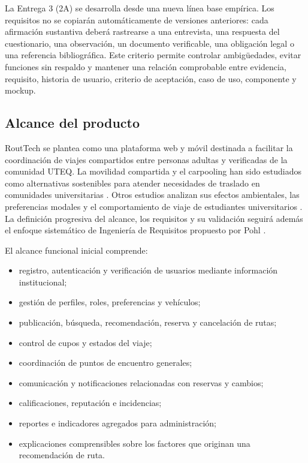 \documentclass[12pt,a4paper]{article}
\begin{document}
La Entrega 3 (2A) se desarrolla desde una nueva línea base empírica. Los requisitos no se copiarán automáticamente de versiones anteriores: cada afirmación sustantiva deberá rastrearse a una entrevista, una respuesta del cuestionario, una observación, un documento verificable, una obligación legal o una referencia bibliográfica. Este criterio permite controlar ambigüedades, evitar funciones sin respaldo y mantener una relación comprobable entre evidencia, requisito, historia de usuario, criterio de aceptación, caso de uso, componente y mockup.

\subsection{Alcance del producto}

RoutTech se plantea como una plataforma web y móvil destinada a facilitar la coordinación de viajes compartidos entre personas adultas y verificadas de la comunidad UTEQ. La movilidad compartida y el carpooling han sido estudiados como alternativas sostenibles para atender necesidades de traslado en comunidades universitarias \cite{alquhtani2022,lopezchila2025}. Otros estudios analizan sus efectos ambientales, las preferencias modales y el comportamiento de viaje de estudiantes universitarios \cite{arbelaez2023,bagdatli2022,etminani2023,tomas2021,zhu2022}. La definición progresiva del alcance, los requisitos y su validación seguirá además el enfoque sistemático de Ingeniería de Requisitos propuesto por Pohl \cite{pohl2010}.

El alcance funcional inicial comprende:

\begin{itemize}
  \item registro, autenticación y verificación de usuarios mediante información institucional;
  \item gestión de perfiles, roles, preferencias y vehículos;
  \item publicación, búsqueda, recomendación, reserva y cancelación de rutas;
  \item control de cupos y estados del viaje;
  \item coordinación de puntos de encuentro generales;
  \item comunicación y notificaciones relacionadas con reservas y cambios;
  \item calificaciones, reputación e incidencias;
  \item reportes e indicadores agregados para administración;
  \item explicaciones comprensibles sobre los factores que originan una recomendación de ruta.
\end{itemize}
\end{document}
